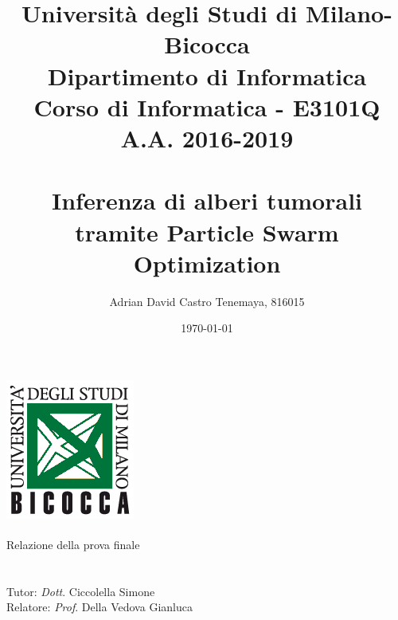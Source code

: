 \documentclass[a4paper,12pt,openright,twoside]{book}
\author{Adrian David Castro Tenemaya, 816015}
\title{Università degli Studi di Milano-Bicocca \\{\small Dipartimento di Informatica \\ Corso di Informatica - E3101Q\\A.A. 2016-2019\\\vspace*{0.55in} \ }\\ Inferenza di alberi tumorali tramite Particle Swarm Optimization \vspace*{1.25in}}
\date{\today}
\begin{document}


\makeatletter
    \begin{titlepage}
        \begin{center}
            \includegraphics{disco.png}\\[4ex]
            {\huge \@title} \\
            { Relazione della prova finale } \\
            {\@author} \\
            {\@date} \\
            Tutor: \textit{Dott}. Ciccolella Simone \\
            Relatore: \textit{Prof}. Della Vedova Gianluca
        \end{center}
    \end{titlepage}
\makeatother



\newpage
\tableofcontents
\listoffigures
\listoftables
{}






\printbibliography

\end{document}
